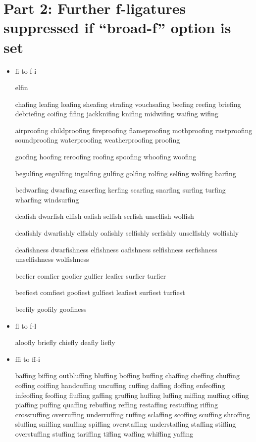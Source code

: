 \section*{Part 2: Further f-ligatures suppressed if ``broad-f'' option is set}

\begin{itemize}

\item fi to f-i

elfin

chafing leafing loafing sheafing strafing vouchsafing
beefing reefing briefing debriefing
coifing fifing jackknifing knifing midwifing waifing wifing

airproofing childproofing fireproofing flameproofing mothproofing rustproofing soundproofing waterproofing weatherproofing proofing

goofing hoofing reroofing roofing spoofing whoofing woofing

begulfing engulfing ingulfing gulfing golfing rolfing selfing wolfing
barfing

bedwarfing dwarfing enserfing kerfing scarfing snarfing
surfing turfing wharfing windsurfing

deafish dwarfish elfish oafish selfish serfish unselfish wolfish

deafishly dwarfishly elfishly oafishly selfishly serfishly unselfishly wolfishly

deafishness dwarfishness elfishness oafishness selfishness serfishness unselfishness wolfishness

beefier comfier goofier gulfier leafier surfier turfier

beefiest comfiest goofiest gulfiest leafiest surfiest turfiest

beefily goofily goofiness


\item fl to f-l

aloofly briefly chiefly deafly liefly


\item ffi to ff-i

baffing biffing outbluffing bluffing boffing buffing chaffing cheffing chuffing coffing coiffing handcuffing uncuffing cuffing daffing doffing enfeoffing infeoffing feoffing fluffing gaffing gruffing huffing luffing miffing muffing offing piaffing puffing quaffing rebuffing reffing restaffing restuffing riffing crossruffing overruffing underruffing ruffing sclaffing scoffing scuffing shroffing sluffing sniffing snuffing spiffing overstaffing understaffing staffing stiffing overstuffing stuffing tariffing tiffing waffing whiffing yaffing


\end{itemize}
